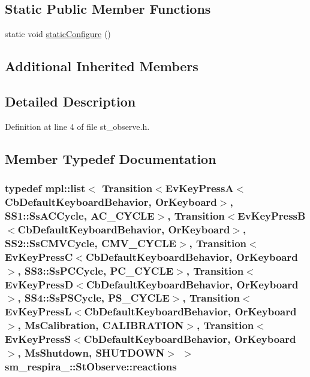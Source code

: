 \subsection*{Static Public Member Functions}
\begin{DoxyCompactItemize}
\item 
static void \hyperlink{structsm__respira__1_1_1StObserve_aebbcdfd15dd19f49629e7bb21ff4624c}{static\+Configure} ()
\end{DoxyCompactItemize}
\subsection*{Additional Inherited Members}


\subsection{Detailed Description}


Definition at line 4 of file st\+\_\+observe.\+h.



\subsection{Member Typedef Documentation}
\subsubsection[{\texorpdfstring{reactions}{reactions}}]{\setlength{\rightskip}{0pt plus 5cm}typedef mpl\+::list$<$ Transition$<$Ev\+Key\+PressA$<$Cb\+Default\+Keyboard\+Behavior, {\bf Or\+Keyboard}$>$, {\bf S\+S1\+::\+Ss\+A\+C\+Cycle}, {\bf A\+C\+\_\+\+C\+Y\+C\+LE}$>$, Transition$<$Ev\+Key\+PressB$<$Cb\+Default\+Keyboard\+Behavior, {\bf Or\+Keyboard}$>$, {\bf S\+S2\+::\+Ss\+C\+M\+V\+Cycle}, {\bf C\+M\+V\+\_\+\+C\+Y\+C\+LE}$>$, Transition$<$Ev\+Key\+PressC$<$Cb\+Default\+Keyboard\+Behavior, {\bf Or\+Keyboard}$>$, {\bf S\+S3\+::\+Ss\+P\+C\+Cycle}, {\bf P\+C\+\_\+\+C\+Y\+C\+LE}$>$, Transition$<$Ev\+Key\+PressD$<$Cb\+Default\+Keyboard\+Behavior, {\bf Or\+Keyboard}$>$, {\bf S\+S4\+::\+Ss\+P\+S\+Cycle}, {\bf P\+S\+\_\+\+C\+Y\+C\+LE}$>$, Transition$<$Ev\+Key\+PressL$<$Cb\+Default\+Keyboard\+Behavior, {\bf Or\+Keyboard}$>$, {\bf Ms\+Calibration}, {\bf C\+A\+L\+I\+B\+R\+A\+T\+I\+ON}$>$, Transition$<$Ev\+Key\+PressS$<$Cb\+Default\+Keyboard\+Behavior, {\bf Or\+Keyboard}$>$, {\bf Ms\+Shutdown}, {\bf S\+H\+U\+T\+D\+O\+WN}$>$ $>$ {\bf sm\+\_\+respira\+\_\+::\+St\+Observe\+::reactions}}\hypertarget{structsm__respira__1_1_1StObserve_a00306e36ae7345cee5a35abc4c88d9c5}{}\label{structsm__respira__1_1_1StObserve_a00306e36ae7345cee5a35abc4c88d9c5}



